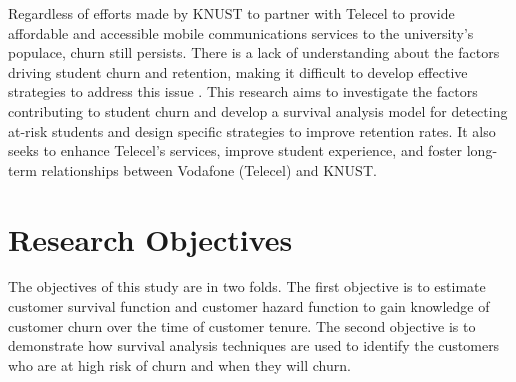 \documentclass[doublespacing]{report} %
\begin{document}
Regardless of efforts made by KNUST to partner with Telecel to provide affordable and accessible mobile communications services to the university’s populace, churn still persists. There is a lack of understanding about the factors driving student churn and retention, making it difficult to develop effective strategies to address this issue \cite{kapur2018}. This research aims to investigate the factors contributing to student churn and develop a survival analysis model for detecting at-risk students and design specific strategies to improve retention rates. It also seeks to enhance Telecel’s services, improve student experience, and foster long-term relationships between Vodafone (Telecel) and KNUST.

\section{Research Objectives}

The objectives of this study are in two folds. The first objective is to estimate customer survival function and customer hazard function to gain knowledge of customer churn over the time of customer tenure. The second objective is to demonstrate how survival analysis techniques are used to identify the customers who are at  high risk of churn and when they will churn.
%	
\end{document}
